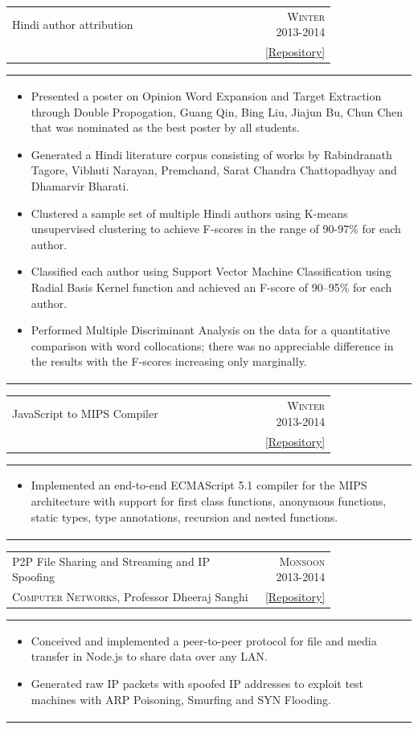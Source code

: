 \documentclass[a4paper]{article} %
\newcommand{\cproject}[5]{
    \begin{tabular}{p{0.80\linewidth}r}
        \textcolor{NavyBlue}{\small #2} & \multicolumn{1}{m{4cm}}{\raggedleft \small {\textsc{#1}}}\\
        \small {#3} & \small {#4}
    \end{tabular}
    \begin{tabular}{p{\linewidth}}
    \vspace{-0.3cm}
        \footnotesize {#5}
    \end{tabular}
    \vspace{-0.5cm}
}
\begin{document}
\cproject
    {Winter 2013-2014}
    {Hindi author attribution}
    {\textsc{\raggedright Artificial Intelligence}, Professor Amitabha Mukherjee}
    { \href{https://github.com/srijanshetty/author-attribution} {[Repository]} }
    {
     \begin{itemize}[leftmargin=0.5cm]
         \item Presented a poster on Opinion Word Expansion and Target Extraction through Double Propogation, Guang Qin,
             Bing Liu, Jiajun Bu, Chun Chen that was nominated as the best poster by all students.
         \item Generated a Hindi literature corpus consisting of works by Rabindranath Tagore,
             Vibhuti Narayan, Premchand, Sarat Chandra Chattopadhyay and Dhamarvir Bharati.
         \item Clustered a sample set of multiple Hindi authors using K-means unsupervised clustering to achieve
             F-scores in the range of 90-97\% for each author.
         \item Classified each author using Support Vector Machine Classification using Radial Basis Kernel function
             and achieved an F-score of 90--95\% for each author.
         \item Performed Multiple Discriminant Analysis on the data for a quantitative comparison with word
             collocations; there was no appreciable difference in the results with the F-scores increasing only
             marginally.
     \end{itemize}
    }

\cproject
    {Winter 2013-2014}
    {JavaScript to MIPS Compiler}
    {\textsc{\raggedright Compilers}, Professor Subhajit Roy}
    { \href{https://github.com/srijanshetty/javascript-compiler} {[Repository]} }
    {
        \begin{itemize}[leftmargin=0.5cm]
          \item Implemented an end-to-end ECMAScript 5.1 compiler for the MIPS architecture with support for first class
          functions, anonymous functions, static types, type annotations, recursion and nested functions.
        \end{itemize}
    }

\cproject
    {Monsoon 2013-2014}
    {P2P File Sharing and Streaming and IP Spoofing}
    {\textsc{Computer Networks}, Professor Dheeraj Sanghi}
    { \href{https://github.com/srijanshetty/nodesock} {[Repository]} }
    {
        \begin{itemize}[leftmargin=0.5cm]
            \item Conceived and implemented a peer-to-peer protocol for file and media transfer in Node.js to share
                data over any LAN.
            \item Generated raw IP packets with spoofed IP addresses to exploit test machines with ARP Poisoning,
                Smurfing and SYN Flooding.
        \end{itemize}
    }
\end{document}
